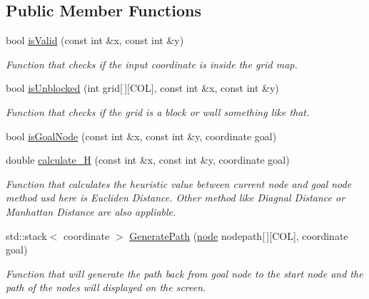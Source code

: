 \subsection*{Public Member Functions}
\begin{DoxyCompactItemize}
\item 
bool \hyperlink{classAstar_ae0a5f0484d586ddf52386342c7ff8b93}{is\-Valid} (const int \&x, const int \&y)
\begin{DoxyCompactList}\small\item\em Function that checks if the input coordinate is inside the grid map. \end{DoxyCompactList}\item 
bool \hyperlink{classAstar_a1613491885502d624c092c6be8cfa6d1}{is\-Unblocked} (int grid\mbox{[}$\,$\mbox{]}\mbox{[}C\-O\-L\mbox{]}, const int \&x, const int \&y)
\begin{DoxyCompactList}\small\item\em Function that checks if the grid is a block or wall something like that. \end{DoxyCompactList}\item 
bool \hyperlink{classAstar_a5525777aa1a1a6331c9c478df8c42591}{is\-Goal\-Node} (const int \&x, const int \&y, coordinate goal)
\item 
double \hyperlink{classAstar_a3f3b3457c622567a78dbf4e4aa0d62e2}{calculate\-\_\-\-H} (const int \&x, const int \&y, coordinate goal)
\begin{DoxyCompactList}\small\item\em Function that calculates the heuristic value between current node and goal node method usd here is Eucliden Distance. Other method like Diagnal Distance or Manhattan Distance are also appliable. \end{DoxyCompactList}\item 
std\-::stack$<$ coordinate $>$ \hyperlink{classAstar_a9063e14becd59719140e99554fb57822}{Generate\-Path} (\hyperlink{structAstar_1_1node}{node} nodepath\mbox{[}$\,$\mbox{]}\mbox{[}C\-O\-L\mbox{]}, coordinate goal)
\begin{DoxyCompactList}\small\item\em Function that will generate the path back from goal node to the start node and the path of the nodes will displayed on the screen. \end{DoxyCompactList}\end{DoxyCompactItemize}


